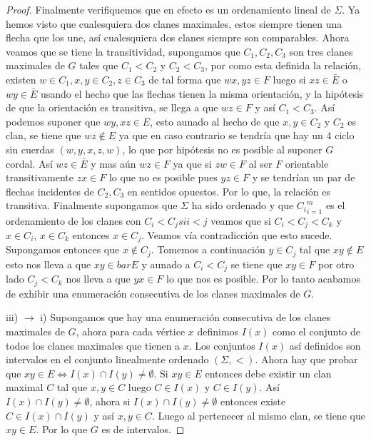 \begin{proof}
    Finalmente verifiquemos que en efecto es un ordenamiento lineal de $\Sigma$. Ya hemos visto que cualesquiera dos clanes maximales, estos siempre tienen una flecha que los une, así cualesquiera dos clanes siempre son comparables. Ahora veamos que se tiene la transitividad, supongamos que $C_1,C_2, C_3$ son tres clanes maximales de $G$ tales que $C_1<C_2$ y $C_2 <C_3$, por como esta definida la relación, existen $w\in C_1, x,y\in C_2, z\in C_3$ de tal forma que $wx, yz \in F$ luego si $xz \in \bar{E}$ o $wy \in \bar{E}$ usando el hecho que las flechas tienen la misma orientación, y la hipótesis de que la orientación es transitiva, se llega a que $wz \in F$ y así $C_1 < C_3$. Así podemos suponer que $wy, xz \in E$, esto aunado al hecho de que $x,y\in C_2$ y $C_2$ es clan, se tiene que $wz\notin E$ ya que en caso contrario se tendría que hay un 4 ciclo sin cuerdas $(w,y,x,z,w)$, lo que por hipótesis no es posible al suponer $G$ cordal. Así $wz\in \bar{E}$ y mas aún $wz \in F$ ya que si $zw\in F$ al ser $F$ orientable transitivamente $zx \in F$ lo que no es posible pues $yz\in F$ y se tendrían un par de flechas incidentes de $C_2, C_3$ en sentidos opuestos. Por lo que, la relación es transitiva. Finalmente supongamos que $\Sigma$ ha sido ordenado y que ${C_i}_{i=1}^m$ es el ordenamiento de los clanes con $C_i<C_j si i<j$ veamos que si $C_i<C_j<C_k$ y $x\in C_i $, $x\in C_k$ entonces $x\in C_j$. Veamos vía contradicción que esto sucede. Supongamos entonces que $x\notin C_j$. Tomemos a continuación $y\in C_j$ tal que $xy\notin E$ esto nos lleva a que $xy\in bar{E}$ y aunado a $C_i<C_j$ se tiene que $xy\in F$ por otro lado $C_j< C_k$ nos lleva a que $yx\in F$ lo que nos es posible. Por lo tanto acabamos de exhibir una enumeración consecutiva de los clanes maximales de $G$.

    iii) $\to$ i) Supongamos que hay una enumeración consecutiva de los clanes maximales de $G$, ahora para cada vértice $x$ definimos $I(x)$ como el conjunto de todos los clanes maximales que tienen a $x$. Los conjuntos $I(x)$ así definidos son intervalos en el conjunto linealmente ordenado $(\Sigma,<)$. Ahora hay que probar que $xy\in E \Leftrightarrow I(x)\cap I(y)\neq \emptyset$. Si $xy\in E$ entonces debe existir un clan maximal $C$ tal que $x,y \in C$ luego $C\in I(x)$ y $C\in I(y)$. Así $I(x)\cap I(y)\neq \emptyset$, ahora si $I(x)\cap I(y)\neq \emptyset$ entonces existe $C\in I(x)\cap I(y)$ y así $x,y\in C$. Luego al pertenecer al mismo clan, se tiene que $xy\in E$. Por lo que $G$ es de intervalos.
    

\end{proof}
